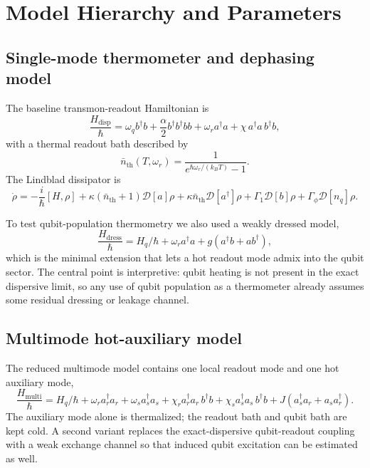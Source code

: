 \documentclass[11pt]{article}
\begin{document}
\section{Model Hierarchy and Parameters}
\subsection{Single-mode thermometer and dephasing model}
The baseline transmon-readout Hamiltonian is
\begin{equation}
\frac{H_{\mathrm{disp}}}{\hbar}
=
\omega_q b^\dagger b
+ \frac{\alpha}{2} b^\dagger b^\dagger b b
+ \omega_r a^\dagger a
+ \chi\, a^\dagger a\, b^\dagger b,
\label{eq:h_disp}
\end{equation}
with a thermal readout bath described by
\begin{equation}
\bar n_{\mathrm{th}}(T,\omega_r)=\frac{1}{e^{\hbar \omega_r/(k_B T)}-1}.
\label{eq:nth}
\end{equation}
The Lindblad dissipator is
\begin{equation}
\dot \rho = -\frac{i}{\hbar}[H,\rho]
+ \kappa(\bar n_{\mathrm{th}}+1)\mathcal D[a]\rho
+ \kappa\bar n_{\mathrm{th}}\mathcal D[a^\dagger]\rho
+ \Gamma_1 \mathcal D[b]\rho
+ \Gamma_\phi \mathcal D[n_q]\rho.
\label{eq:lindblad_single}
\end{equation}

To test qubit-population thermometry we also used a weakly dressed model,
\begin{equation}
\frac{H_{\mathrm{dress}}}{\hbar}
=
H_q/\hbar + \omega_r a^\dagger a + g(a^\dagger b + a b^\dagger),
\label{eq:h_dressed}
\end{equation}
which is the minimal extension that lets a hot readout mode admix into the qubit sector. The central point is interpretive: qubit heating is not present in the exact dispersive limit, so any use of qubit population as a thermometer already assumes some residual dressing or leakage channel.

\subsection{Multimode hot-auxiliary model}
The reduced multimode model contains one local readout mode and one hot auxiliary mode,
\begin{equation}
\frac{H_{\mathrm{multi}}}{\hbar}
=
H_q/\hbar
+ \omega_r a_r^\dagger a_r
+ \omega_s a_s^\dagger a_s
+ \chi_r a_r^\dagger a_r\, b^\dagger b
+ \chi_s a_s^\dagger a_s\, b^\dagger b
+ J(a_s^\dagger a_r + a_s a_r^\dagger).
\label{eq:h_multimode}
\end{equation}
The auxiliary mode alone is thermalized; the readout bath and qubit bath are kept cold. A second variant replaces the exact-dispersive qubit-readout coupling with a weak exchange channel so that induced qubit excitation can be estimated as well.
\end{document}
